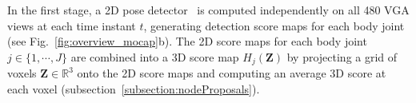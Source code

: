 In the first stage, a 2D pose detector~\cite{Wei2016} is computed independently on all 480 VGA views at each time instant $t$, generating detection score maps for each body joint (see Fig.~\ref{fig:overview_mocap}b). The 2D score maps for each body joint~$j\in\{1,\cdots,J\}$ are combined into a 3D score map $H_j(\mathbf{Z})$ by projecting a grid of voxels $\mathbf{Z}\in \mathds{R}^3$ onto the 2D score maps and computing an average 3D score at each voxel (subsection~\ref{subsection:nodeProposals}).

